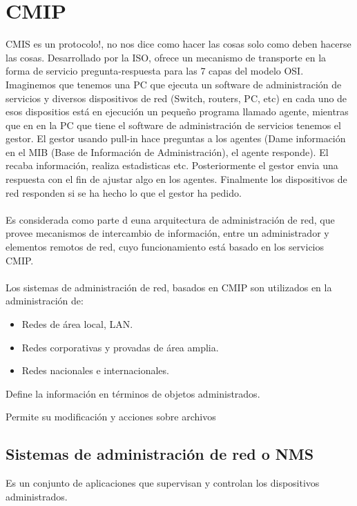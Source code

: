 \section{CMIP}
CMIS es un protocolo!, no nos dice como hacer las cosas solo como deben hacerse las cosas.  Desarrollado por la ISO, ofrece un mecanismo de transporte en la forma de servicio pregunta-respuesta para las 7 capas del modelo OSI. Imaginemos que tenemos una PC que ejecuta un software de administración de servicios y diversos dispositivos de red (Switch, routers, PC, etc) en cada uno de esos dispositios está en ejecución un pequeño programa llamado agente, mientras que en en la PC que tiene el software de administración de servicios tenemos el gestor. El gestor usando pull-in hace preguntas a los agentes (Dame información en el MIB (Base de Información de Administración), el agente responde). El recaba información, realiza estadisticas etc. Posteriormente el gestor envia una respuesta con el fin de ajustar algo en los agentes. Finalmente los dispositivos de red responden si se ha hecho lo que el gestor ha pedido.\\\\

Es considerada como parte d euna arquitectura de administración de red, que provee mecanismos de intercambio de información, entre un administrador y elementos remotos de red, cuyo funcionamiento está basado en los servicios CMIP.\\\\

Los sistemas de administración de red, basados en CMIP son utilizados en la administración de:

\begin{itemize}
    \item Redes de área local, LAN.
    \item Redes corporativas y provadas de área amplia.
    \item Redes nacionales e internacionales.
\end{itemize}

Define la información en términos de objetos administrados.

Permite su modificación y acciones sobre archivos

\subsection{Sistemas de administración de red o NMS}
Es un conjunto de aplicaciones que supervisan y controlan los dispositivos administrados.

